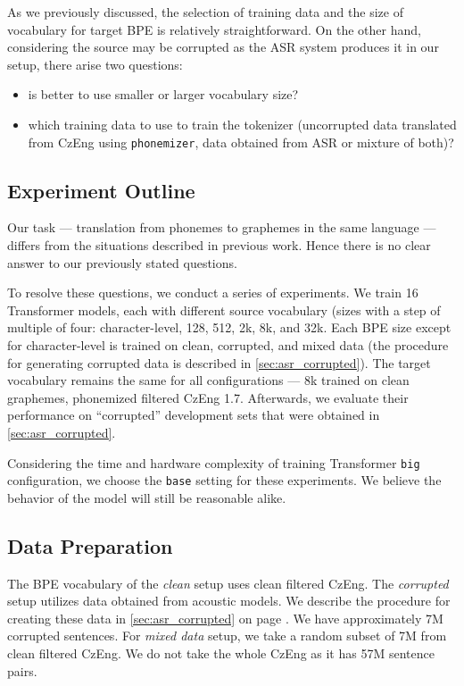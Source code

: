 As we previously discussed, the selection of training data and the size of vocabulary for target BPE is relatively straightforward. On the other hand, considering the source may be corrupted as the ASR system produces it in our setup, there arise two questions: 

\begin{itemize}
	\item is better to use smaller or larger vocabulary size?
	\item which training data to use to train the tokenizer (uncorrupted data translated from CzEng using \texttt{phonemizer}, data obtained from ASR or mixture of both)?
\end{itemize}



\subsection{Experiment Outline}
Our task --- translation from phonemes to graphemes in the same language --- differs from the situations described in previous work. Hence there is no clear answer to our previously stated questions.

To resolve these questions, we conduct a series of experiments. We train 16 Transformer models, each with different source vocabulary (sizes with a step of multiple of four: character-level, 128, 512, 2k, 8k, and 32k. Each BPE size except for character-level is trained on clean, corrupted, and mixed data (the procedure for generating corrupted data is described in \cref{sec:asr_corrupted}). The target vocabulary remains the same for all configurations --- 8k trained on clean graphemes, phonemized filtered CzEng 1.7. Afterwards, we evaluate their performance on ``corrupted'' development sets that were obtained in \cref{sec:asr_corrupted}.

Considering the time and hardware complexity of training Transformer \texttt{big} configuration, we choose the \texttt{base} setting for these experiments. We believe the behavior of the model will still be reasonable alike.

\subsection{Data Preparation}
The BPE vocabulary of the \textit{clean} setup uses clean filtered CzEng. The \textit{corrupted} setup utilizes data obtained from acoustic models. We describe the procedure for creating these data in \cref{sec:asr_corrupted} on page \pageref{sec:asr_corrupted}. We have approximately 7M corrupted sentences. For \textit{mixed data} setup, we take a random subset of 7M from clean filtered CzEng. We do not take the whole CzEng as it has 57M sentence pairs. 

